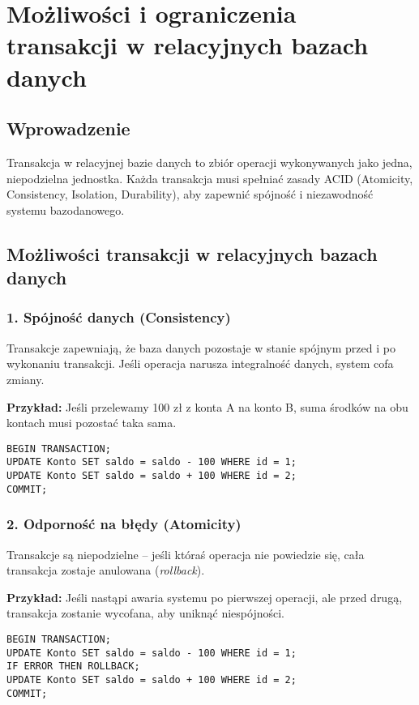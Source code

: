 \section{Możliwości i ograniczenia transakcji w relacyjnych bazach danych}

\subsection{Wprowadzenie}
Transakcja w relacyjnej bazie danych to zbiór operacji wykonywanych jako jedna, niepodzielna jednostka. Każda transakcja musi spełniać zasady ACID (Atomicity, Consistency, Isolation, Durability), aby zapewnić spójność i niezawodność systemu bazodanowego.

\subsection{Możliwości transakcji w relacyjnych bazach danych}

\subsubsection{1. Spójność danych (Consistency)}
Transakcje zapewniają, że baza danych pozostaje w stanie spójnym przed i po wykonaniu transakcji. Jeśli operacja narusza integralność danych, system cofa zmiany.

\textbf{Przykład:}  
Jeśli przelewamy 100 zł z konta A na konto B, suma środków na obu kontach musi pozostać taka sama.

\begin{verbatim}
BEGIN TRANSACTION;
UPDATE Konto SET saldo = saldo - 100 WHERE id = 1;
UPDATE Konto SET saldo = saldo + 100 WHERE id = 2;
COMMIT;
\end{verbatim}

\subsubsection{2. Odporność na błędy (Atomicity)}
Transakcje są niepodzielne – jeśli któraś operacja nie powiedzie się, cała transakcja zostaje anulowana (\textit{rollback}).

\textbf{Przykład:}  
Jeśli nastąpi awaria systemu po pierwszej operacji, ale przed drugą, transakcja zostanie wycofana, aby uniknąć niespójności.

\begin{verbatim}
BEGIN TRANSACTION;
UPDATE Konto SET saldo = saldo - 100 WHERE id = 1;
IF ERROR THEN ROLLBACK;
UPDATE Konto SET saldo = saldo + 100 WHERE id = 2;
COMMIT;
\end{verbatim}

